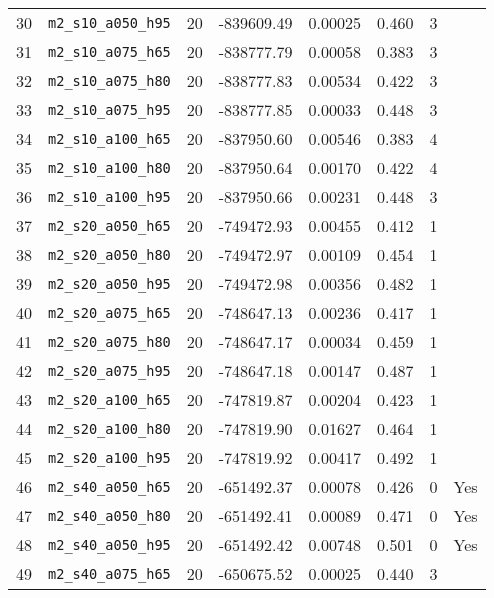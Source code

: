 \begin{table}[ht]
\begin{tabular}{cccccccc}
    30 & \verb|m2_s10_a050_h95| &       20 & -839609.49 &  0.00025 &     0.460 &      3      \\
    31 & \verb|m2_s10_a075_h65| &       20 & -838777.79 &  0.00058 &     0.383 &      3      \\
    32 & \verb|m2_s10_a075_h80| &       20 & -838777.83 &  0.00534 &     0.422 &      3      \\
    33 & \verb|m2_s10_a075_h95| &       20 & -838777.85 &  0.00033 &     0.448 &      3      \\
    34 & \verb|m2_s10_a100_h65| &       20 & -837950.60 &  0.00546 &     0.383 &      4      \\
    35 & \verb|m2_s10_a100_h80| &       20 & -837950.64 &  0.00170 &     0.422 &      4      \\
    36 & \verb|m2_s10_a100_h95| &       20 & -837950.66 &  0.00231 &     0.448 &      3      \\
    37 & \verb|m2_s20_a050_h65| &       20 & -749472.93 &  0.00455 &     0.412 &      1      \\
    38 & \verb|m2_s20_a050_h80| &       20 & -749472.97 &  0.00109 &     0.454 &      1      \\
    39 & \verb|m2_s20_a050_h95| &       20 & -749472.98 &  0.00356 &     0.482 &      1      \\
    40 & \verb|m2_s20_a075_h65| &       20 & -748647.13 &  0.00236 &     0.417 &      1      \\
    41 & \verb|m2_s20_a075_h80| &       20 & -748647.17 &  0.00034 &     0.459 &      1      \\
    42 & \verb|m2_s20_a075_h95| &       20 & -748647.18 &  0.00147 &     0.487 &      1      \\
    43 & \verb|m2_s20_a100_h65| &       20 & -747819.87 &  0.00204 &     0.423 &      1      \\
    44 & \verb|m2_s20_a100_h80| &       20 & -747819.90 &  0.01627 &     0.464 &      1      \\
    45 & \verb|m2_s20_a100_h95| &       20 & -747819.92 &  0.00417 &     0.492 &      1      \\
    46 & \verb|m2_s40_a050_h65| &       20 & -651492.37 &  0.00078 &     0.426 &      0 & Yes\\
    47 & \verb|m2_s40_a050_h80| &       20 & -651492.41 &  0.00089 &     0.471 &      0 & Yes\\
    48 & \verb|m2_s40_a050_h95| &       20 & -651492.42 &  0.00748 &     0.501 &      0 & Yes\\
    49 & \verb|m2_s40_a075_h65| &       20 & -650675.52 &  0.00025 &     0.440 &      3      \\

\end{tabular}
\end{table}
